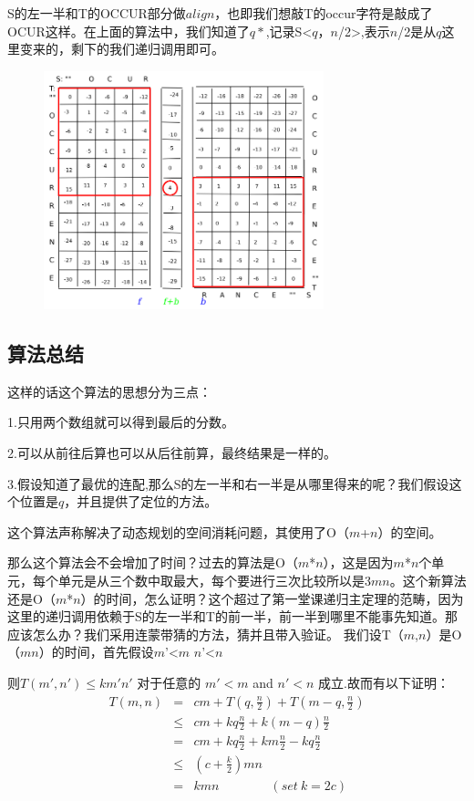 S的左一半和T的OCCUR部分做$align$，也即我们想敲T的occur字符是敲成了OCUR这样。在上面的算法中，我们知道了$q*$,记录S<$q$，$n$/2>,表示$n$/2是从$q$这里变来的，剩下的我们递归调用即可。
\begin{figure}[H]
\centering
\includegraphics[width=3.2in]{14.png}
\end{figure}
\subsection{算法总结}
这样的话这个算法的思想分为三点：

    1.只用两个数组就可以得到最后的分数。

    2.可以从前往后算也可以从后往前算，最终结果是一样的。

    3.假设知道了最优的连配,那么S的左一半和右一半是从哪里得来的呢？我们假设这个位置是$q$，并且提供了定位的方法。

这个算法声称解决了动态规划的空间消耗问题，其使用了O（$m$+$n$）的空间。

那么这个算法会不会增加了时间？过去的算法是O（$m$*$n$），这是因为$m$*$n$个单元，每个单元是从三个数中取最大，每个要进行三次比较所以是3$m$$n$。这个新算法还是O（$m$*$n$）的时间，怎么证明？这个超过了第一堂课递归主定理的范畴，因为这里的递归调用依赖于S的左一半和T的前一半，前一半到哪里不能事先知道。那应该怎么办？我们采用连蒙带猜的方法，猜并且带入验证。
我们设T（$m$,$n$）是O（$m$$n$）的时间，首先假设$m$'<$m$ $n$'<$n$

则$T(m',n') \leq km'n'$ 对于任意的 $m'<m$ and $n'<n$ 成立.故而有以下证明：
\begin{eqnarray}
 T(m,n) & = & cm +  T(q, \frac{n}{2}) + T(m-q, \frac{n}{2})  \\
      &\leq &  cm +  k q  \frac{n}{2} + k (m-q) \frac{n}{2}  \\
      &=& cm +  k q  \frac{n}{2} + k m \frac{n}{2} - k q \frac{n}{2}  \\
      &\leq& (c + \frac{k}{2}) mn  \\
      &=& kmn  \qquad \qquad  (set\ k=2c)
\end{eqnarray}

